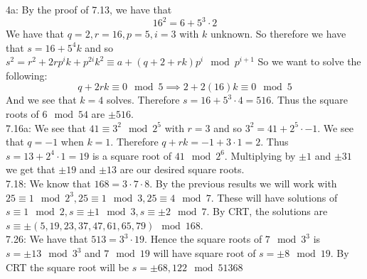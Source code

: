 \documentclass[letterpaper]{article}
\begin{document}
 4a: By the proof of 7.13, we have that $$16^2=6+5^3\cdot 2$$
We have that $q=2,r=16,p=5,i=3$ with $k$ unknown. So therefore we have that $s=16+5^4k$ and so $s^2 = r^2+2rp^ik+p^{2i}k^2 \equiv a+(q+2+rk)p^{i}\mod{p^{i+1}}$
So we want to solve the following: 
$$q+ 2rk \equiv 0\mod{5} \implies 2+2(16)k\equiv 0 \mod{5}$$ And we see that $k=4$ solves. Therefore $s=16+5^3\cdot 4 = 516$. Thus the square roots of $6 \mod{54}$ are $\pm 516$. 
\newline \\ 7.16a: We see that $41 \equiv 3^2 \mod{2^5}$ with $r=3$ and so $3^2= 41+2^5\cdot -1$. We see that $q=-1$ when $k=1$. Therefore $q+rk = -1+3\cdot 1 = 2$. Thus $s=13+2^4\cdot 1=19$ is a square root of $41\mod{2^6}$. Multiplying by $\pm 1$ and $\pm 31$ we get that $\pm 19$ and $\pm 13$ are our desired square roots. 
\newline \\ 7.18: We know that $168 = 3\cdot 7\cdot 8$. By the previous results we will work with $25 \equiv 1 \mod{2^3}, 25 \equiv 1 \mod{3}, 25\equiv 4 \mod{7}$. These will have solutions of $s\equiv 1 \mod{2}, s\equiv \pm 1\mod{3}, s\equiv \pm 2\mod{7}$. By CRT, the solutions are $s\equiv \pm (5,19,23,37,47,61,65,79) \mod{168}$. 
\newline \\ 7.26: We have that $513 = 3^3 \cdot 19$. Hence the square roots of $7\mod{3^3}$ is $s = \pm 13\mod{3^3}$ and $7\mod{19}$ will have square root of $s = \pm 8 \mod{19}$. By CRT the square root will be $s = \pm 68, 122\mod{513} 68$
\end{document}
